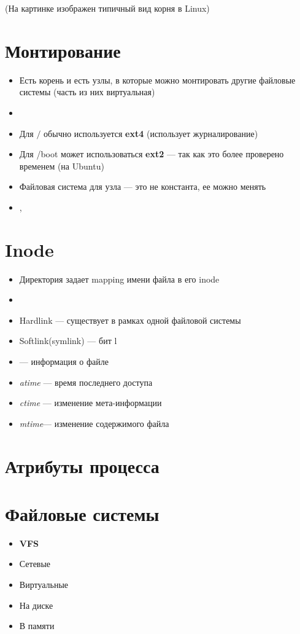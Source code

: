 \documentclass[../../lectures.tex]{subfiles}
\begin{document}
\begin{center}(На картинке изображен типичный вид корня в Linux)\end{center}

\section{Монтирование}
\begin{itemize}
    \item Есть корень и есть узлы, в которые можно монтировать другие файловые системы (часть из них виртуальная)
    \item {}
    \item Для $/$ обычно используется \textbf{ext4} (использует журналирование)
    \item Для /boot может использоваться \textbf{ext2} --- так как это более проверено временем (на Ubuntu)
    \item Файловая система для узла --- это не константа, ее можно менять
    \item {}, 
\end{itemize}

\section{Inode}
\begin{itemize}
    \item Директория задает mapping имени файла в его inode
    \item {}
    \item Hardlink --- существует в рамках одной файловой системы
    \item Softlink(symlink) --- бит l
    \item {} --- информация о файле
    \item \emph{atime} --- время последнего доступа
    \item \emph{ctime} --- изменение мета-информации
    \item \emph{mtime}--- изменение содержимого файла
\end{itemize}

\section{Атрибуты процесса}
\todo{}

\section{Файловые системы}
\begin{itemize}
    \item \textbf{VFS}
    \item Сетевые
    \item Виртуальные
    \item На диске
    \item В памяти
\end{itemize}
\end{document}
